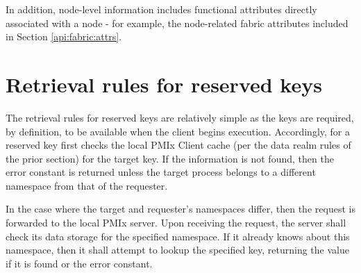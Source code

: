 \vspace{\baselineskip}

In addition, node-level information includes functional attributes directly associated with a node - for example, the node-related fabric attributes included in Section \ref{api:fabric:attrs}.

\section{Retrieval rules for reserved keys}
\label{chap:rkeys:retrules}

The retrieval rules for reserved keys are relatively simple as the keys are
required, by definition, to be available when the client begins execution.
Accordingly,  for a reserved key first checks the local
\ac{PMIx} Client cache (per the data realm rules of the prior section) for the target key. If the information is not found,
then the  error constant is returned unless the
target process belongs to a different namespace from that of the requester.

In the case where the target and requester's namespaces differ, then the
request is forwarded to the local \ac{PMIx} server. Upon receiving the
request, the server shall check its data storage for the specified namespace.
If it already knows about this namespace, then it shall attempt to lookup the
specified key, returning the value if it is found or the
 error constant.

